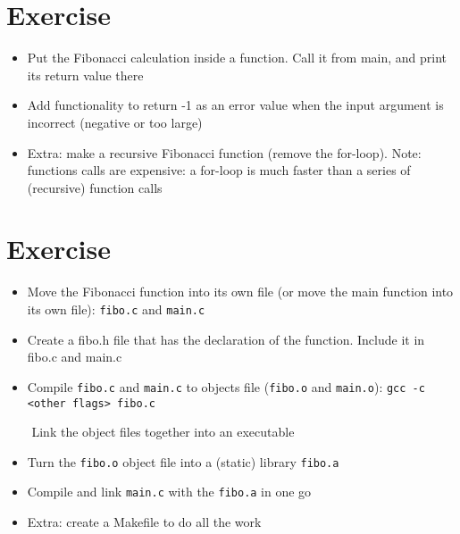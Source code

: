 \documentclass[a4paper]{article}
\begin{document}
\clearpage

\section{Exercise}

\begin{itemize}
\item Put the Fibonacci calculation inside a function. Call it from main, and print its return value there

\item Add functionality to return -1 as an error value when the input argument is incorrect (negative or too large)

\item Extra: make a recursive Fibonacci function (remove the for-loop).
  Note: functions calls are expensive: a for-loop is much faster than a series of (recursive) function calls
\end{itemize}

\section{Exercise}

\begin{itemize}

\item Move the Fibonacci function into its own file (or move the main function into its own file): \lstinline|fibo.c| and \lstinline|main.c|
  
\item Create a fibo.h file that has the declaration of the function. Include it in fibo.c and main.c
  
\item Compile \lstinline|fibo.c| and \lstinline|main.c| to objects file (\lstinline|fibo.o| and \lstinline|main.o|): \lstinline|gcc -c <other flags> fibo.c|

   Link the object files together into an executable
  
\item Turn the \lstinline|fibo.o| object file into a (static) library \lstinline|fibo.a|
  
\item Compile and link \lstinline|main.c| with the \lstinline|fibo.a| in one go
  
\item Extra: create a Makefile to do all the work

\end{itemize}
\end{document}
